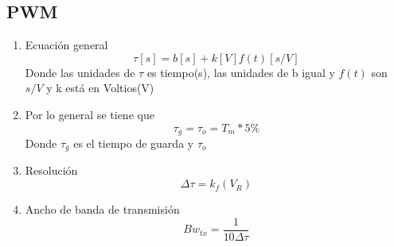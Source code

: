 \documentclass[10pt]{article}
\begin{document}
\subsection{PWM}
	\begin{enumerate}
		\item Ecuación general
		\begin{equation}
			\tau[s]=b[s]+k[V]f(t)[s/V]
		\end{equation}
		Donde las unidades de $\tau$ es tiempo(s), las unidades de b igual y $f(t)$ son $s/V$ y k está en Voltios(V)
		\item Por lo general se tiene que
		\begin{equation}
			\tau_g=\tau_o=T_m*5\%
		\end{equation}
		Donde $\tau_g$ es el tiempo de guarda y $\tau_o$
		\item Resolución
		\begin{equation}
		\Delta\tau=k_f(V_R)
		\end{equation}
		\item Ancho de banda de transmisión
		\begin{equation}
			Bw_{tx}=\frac{1}{10\Delta\tau}
		\end{equation}
	\end{enumerate}
\end{document}
